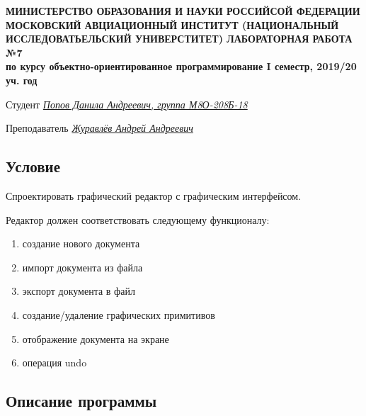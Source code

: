\documentclass[12pt]{article}
\begin{document}
\begin{titlepage}
\begin{center}
\textbf{МИНИСТЕРСТВО ОБРАЗОВАНИЯ И НАУКИ РОССИЙСОЙ ФЕДЕРАЦИИ
\medskip
МОСКОВСКИЙ АВЦИАЦИОННЫЙ ИНСТИТУТ
(НАЦИОНАЛЬНЫЙ ИССЛЕДОВАТЬЕЛЬСКИЙ УНИВЕРСТИТЕТ)
\vfill\vfill
{\Huge ЛАБОРАТОРНАЯ РАБОТА №7} \\
по курсу объектно-ориентированное программирование
I семестр, 2019/20 уч. год}
\end{center}
\vfill

Студент \uline{\it {Попов Данила Андреевич, группа М8О-208Б-18}\hfill}

Преподаватель \uline{\it {Журавлёв Андрей Андреевич}\hfill}

\vfill
\end{titlepage}

\subsection*{Условие}

Спроектировать графический редактор с графическим интерфейсом.

Редактор должен соответствовать следующему функционалу:
\begin{enumerate}
\item создание нового документа 
\item импорт документа из файла
\item экспорт документа в файл
\item создание/удаление графических примитивов 
\item отображение документа на экране
\item операция undo
\end{enumerate}

\subsection*{Описание программы}
\end{document}

